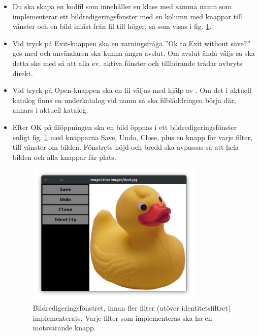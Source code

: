 \begin{itemize}
\item Du ska skapa en kodfil  som innehåller en klass med samma namn som implementerar ett bildredigeringsfönster med en kolumn med knappar till vänster och en bild inläst från fil till höger, så som visas i fig. \ref{photo:fig:editor-one-filter}. 

\item Vid tryck på Exit-knappen ska en varningsfråga ''Ok to Exit without save?'' ges med  och användaren ska kunna ångra avslut. Om avslut ändå väljs så ska detta ske med  så att alla ev. aktiva fönster och tillhörande trådar avbryts direkt.

\item Vid tryck på Open-knappen ska en fil väljas med hjälp av . Om det i aktuell katalog finns en underkatalog vid namn  så ska filbläddringen börja där, annars i aktuell katalog. 

\item Efter OK på filöppningen ska en bild öppnas i ett bildredigeringsfönster enligt fig. \ref{photo:fig:editor-one-filter} med knapparna Save, Undo, Close, plus en knapp för varje filter, till vänster om bilden. Fönstrets höjd och bredd ska avpassas så att hela bilden och alla knappar får plats.

\begin{figure}
\centering
\includegraphics[width=0.8\textwidth]{../img/w12-assignment-photo/photo-duck.png}
\caption{Bildredigeringsfönstret, innan fler filter (utöver identitetsfiltret) implementerats. Varje filter som implementeras ska ha en motsvarande knapp.}
\label{photo:fig:editor-one-filter}
\end{figure}


\end{itemize}
